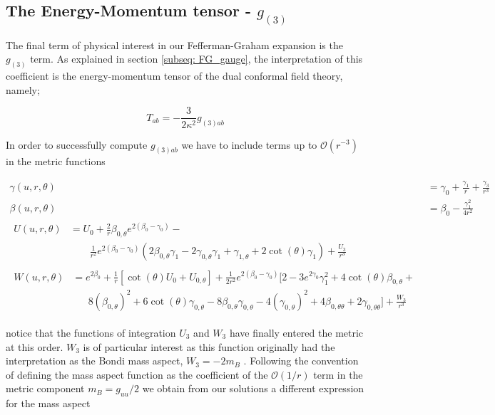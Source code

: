 \documentclass[a4paper,11pt]{article}
\numberwithin{equation}{section}
\begin{document}
\subsection{The Energy-Momentum tensor - $g_{(3)}$}

The final term of physical interest in our Fefferman-Graham expansion is the $g_{(3)}$ term. As explained in section \ref{subseq: FG_gauge}, the interpretation of this coefficient is the energy-momentum tensor of the dual conformal field theory, namely; 

\begin{equation}
T_{ab}=-\frac{3}{2\kappa^2}g_{(3)ab}
\end{equation}

In order to successfully compute $g_{(3)ab}$ we have to include terms up to $\mathcal{O}(r^{-3})$ in the metric functions

\begin{subequations}
\begin{align}
\gamma(u,r,\theta)&=\gamma_{0}+ \frac{\gamma_1}{r}+\frac{\gamma_3}{r^3}\\
\beta(u,r,\theta)&=\beta_{0}-\frac{\gamma_1^2}{4r^2} \\
\begin{split}
U(u,r,\theta)&=U_{0}+\frac{2}{r}\beta_{0, \theta} e^{2( \beta_0- \gamma_0)} - \\
& \phantom{--} \frac{1}{r^2}e^{2( \beta_0- \gamma_0)} (2 \beta_{0,\theta} \gamma_1-2 \gamma_{0,\theta}\gamma_1+\gamma_{1,\theta}+2 \cot (\theta ) \gamma_1)+\frac{U_3}{r^3}
\end{split}\\
\begin{split}
W(u,r,\theta)&=e^{2\beta_{0}}+\frac{1}{r}[\cot(\theta)U_{0}+U_{0,\theta}]+ \frac{1}{2r^2}e^{2(\beta_{0}-\gamma_{0})}[2-3e^{2\gamma_0}\gamma_1^2+4\cot(\theta)\beta_{0,\theta}+\\
&\phantom{aaa}8(\beta_{0,\theta})^2+6\cot(\theta)\gamma_{0,\theta}-8\beta_{0,\theta}\gamma_{0,\theta}-4(\gamma_{0,\theta})^2+4\beta_{0,\theta \theta}+2\gamma_{0,\theta \theta}]+\frac{W_3}{r^3}
\end{split}
\end{align}
\end{subequations}

\noindent notice that the functions of integration $U_3$ and $W_3$ have finally entered the metric at this order. $W_3$ is of particular interest as this function originally had the interpretation as the Bondi mass aspect, $W_3=-2m_B$ \cite{Bondi:1962px}. Following the convention of defining the mass aspect function as the coefficient of the $\mathcal{O}(1/r)$ term in the metric component $m_B=g_{uu}/2$ \cite{Chrusciel:2016oux} we obtain from our solutions a different expression for the mass aspect
\end{document}
